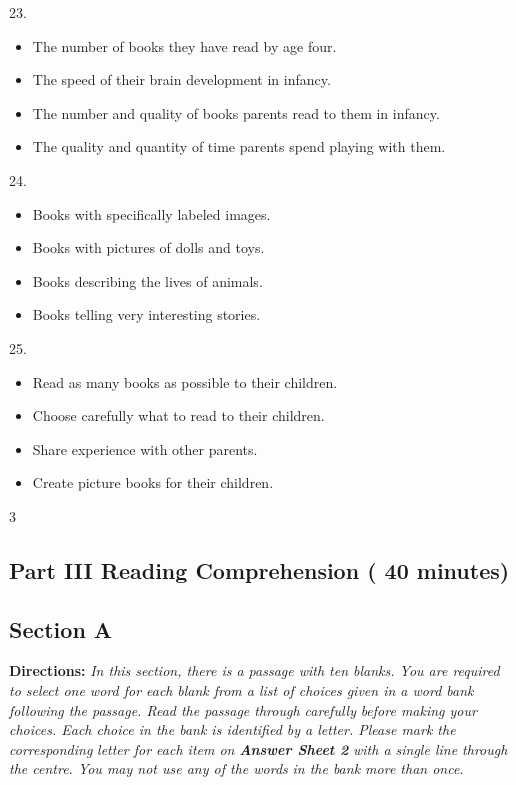 \documentclass[UTF8,11pt]{ctexart}
\begin{document}
23.


\begin{itemize}[leftmargin=2em,itemsep=.2em,topsep=.4em]\item[A.] The number of books they have read by age four.
\item[B.] The speed of their brain development in infancy.
\item[C.] The number and quality of books parents read to them in infancy.
\item[D.] The quality and quantity of time parents spend playing with them.
\end{itemize}

24.


\begin{itemize}[leftmargin=2em,itemsep=.2em,topsep=.4em]\item[A.] Books with specifically labeled images.
\item[B.] Books with pictures of dolls and toys.
\item[C.] Books describing the lives of animals.
\item[D.] Books telling very interesting stories.
\end{itemize}

25.


\begin{itemize}[leftmargin=2em,itemsep=.2em,topsep=.4em]\item[A.] Read as many books as possible to their children.
\item[B.] Choose carefully what to read to their children.
\item[C.] Share experience with other parents.
\item[D.] Create picture books for their children.
\end{itemize}

3


\subsection*{\textbf{Part III Reading Comprehension ( 40 minutes)}}


\subsection*{\textbf{Section A}}


\textbf{Directions:} \textit{In this section, there is a passage with ten blanks. You are required to select one word for each} \textit{blank from a list of choices given in a word bank following the passage. Read the passage through carefully} \textit{before making your choices. Each choice in the bank is identified by a letter. Please mark the corresponding} \textit{letter for each item on }\textbf{\textit{Answer Sheet 2}}\textit{ with a single line through the centre. You may not use any of the words} \textit{in the bank more than once.}
\end{document}
